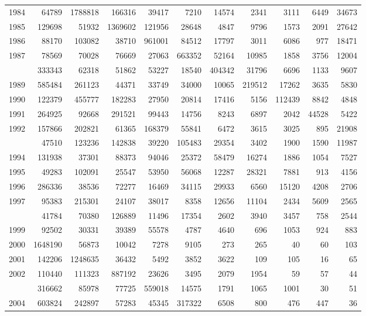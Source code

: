\documentclass[
]{article}
\begin{document}
\begin{longtable}[t]{lrrrrrrrrrr}
1984 & 64789 & 1788818 & 166316 & 39417 & 7210 & 14574 & 2341 & 3111 & 6449 & 34673\\
1985 & 129698 & 51932 & 1369602 & 121956 & 28648 & 4847 & 9796 & 1573 & 2091 & 27642\\
1986 & 88170 & 103082 & 38710 & 961001 & 84512 & 17797 & 3011 & 6086 & 977 & 18471\\
1987 & 78569 & 70028 & 76669 & 27063 & 663352 & 52164 & 10985 & 1858 & 3756 & 12004\\
\addlinespace
1988 & 333343 & 62318 & 51862 & 53227 & 18540 & 404342 & 31796 & 6696 & 1133 & 9607\\
1989 & 585484 & 261123 & 44371 & 33749 & 34000 & 10065 & 219512 & 17262 & 3635 & 5830\\
1990 & 122379 & 455777 & 182283 & 27950 & 20814 & 17416 & 5156 & 112439 & 8842 & 4848\\
1991 & 264925 & 92668 & 291521 & 99443 & 14756 & 8243 & 6897 & 2042 & 44528 & 5422\\
1992 & 157866 & 202821 & 61365 & 168379 & 55841 & 6472 & 3615 & 3025 & 895 & 21908\\
\addlinespace
1993 & 47510 & 123236 & 142838 & 39220 & 105483 & 29354 & 3402 & 1900 & 1590 & 11987\\
1994 & 131938 & 37301 & 88373 & 94046 & 25372 & 58479 & 16274 & 1886 & 1054 & 7527\\
1995 & 49283 & 102091 & 25547 & 53950 & 56068 & 12287 & 28321 & 7881 & 913 & 4156\\
1996 & 286336 & 38536 & 72277 & 16469 & 34115 & 29933 & 6560 & 15120 & 4208 & 2706\\
1997 & 95383 & 215301 & 24107 & 38017 & 8358 & 12656 & 11104 & 2434 & 5609 & 2565\\
\addlinespace
1998 & 41784 & 70380 & 126889 & 11496 & 17354 & 2602 & 3940 & 3457 & 758 & 2544\\
1999 & 92502 & 30331 & 39389 & 55578 & 4787 & 4640 & 696 & 1053 & 924 & 883\\
2000 & 1648190 & 56873 & 10042 & 7278 & 9105 & 273 & 265 & 40 & 60 & 103\\
2001 & 142206 & 1248635 & 36432 & 5492 & 3852 & 3622 & 109 & 105 & 16 & 65\\
2002 & 110440 & 111323 & 887192 & 23626 & 3495 & 2079 & 1954 & 59 & 57 & 44\\
\addlinespace
2003 & 316662 & 85978 & 77725 & 559018 & 14575 & 1791 & 1065 & 1001 & 30 & 51\\
2004 & 603824 & 242897 & 57283 & 45345 & 317322 & 6508 & 800 & 476 & 447 & 36\\

\end{longtable}
\end{document}
